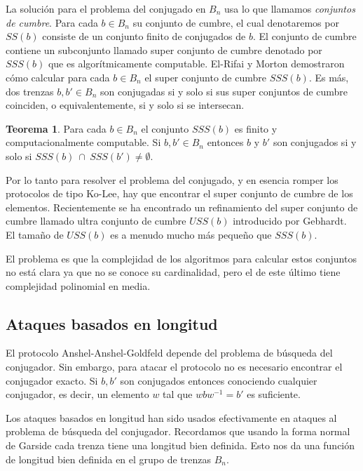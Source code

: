 \documentclass[12pt]{book}
\theoremstyle{definition}
\newtheorem{teor}{Teorema}[section]
\begin{document}
La solución para el problema del conjugado en $B_n$ usa lo que llamamos \textit{conjuntos de cumbre}. Para cada $b\in B_n$ su conjunto de cumbre, el cual denotaremos por $SS(b)$ consiste de un conjunto finito de conjugados de $b$. El conjunto de cumbre contiene un subconjunto llamado super conjunto de cumbre denotado por $SSS(b)$ que es algorítmicamente computable. El-Rifai y Morton demostraron cómo calcular para cada $b\in B_n$ el super conjunto de cumbre $SSS(b)$. Es más, dos trenzas $b,b'\in B_n$ son conjugadas si y solo si sus super conjuntos de cumbre coinciden, o equivalentemente, si y solo si se intersecan.

\begin{teor}
Para cada $b\in B_n$ el conjunto $SSS(b)$ es finito y computacionalmente computable. Si $b,b'\in B_n$ entonces $b$ y $b'$ son conjugados si y solo si $SSS(b)\ \cap\ SSS(b')\neq \emptyset$.
\end{teor}

Por lo tanto para resolver el problema del conjugado, y en esencia romper los protocolos de tipo Ko-Lee, hay que encontrar el super conjunto de cumbre de los elementos. Recientemente se ha encontrado un refinamiento del super conjunto de cumbre llamado ultra conjunto de cumbre $USS(b)$ introducido por Gebhardt. El tamaño de $USS(b)$ es a menudo mucho más pequeño que $SSS(b)$.

El problema es que la complejidad de los algoritmos para calcular estos conjuntos no está clara ya que no se conoce su cardinalidad, pero el de este último tiene complejidad polinomial en media.

\subsection{Ataques basados en longitud}
El protocolo Anshel-Anshel-Goldfeld depende del problema de búsqueda del conjugador. Sin embargo, para atacar el protocolo no es necesario encontrar el conjugador exacto. Si $b,b'$ son conjugados entonces conociendo cualquier conjugador, es decir, un elemento $w$ tal que $wbw^{-1}=b'$ es suficiente.

Los ataques basados en longitud han sido usados efectivamente en ataques al problema de búsqueda del conjugador. Recordamos que usando la forma normal de Garside cada trenza tiene una longitud bien definida. Esto nos da una función de longitud bien definida en el grupo de trenzas $B_n$.
\end{document}
